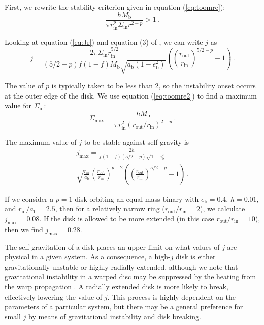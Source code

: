 \documentclass[twocolumn,linenumbers]{aastex631}
\begin{document}
First, we rewrite the stability criterion given in equation (\ref{eq:toomre}):
\begin{equation}
    \label{eq:toomre2}
    \frac{h M_\text{b}}{\pi r_\text{in}^p \Sigma_\text{in} r^{2-p}} > 1\, .
\end{equation}

Looking at equation (\ref{eq:Jr}) and equation (3) of \citet{abod2022}, we can write $j$ as
\begin{equation}
    \label{eq:j-full-disk}
    j = \frac{2\pi \Sigma_\text{in} r_\text{in}^{5/2}}{(5/2-p)f(1-f)M_\text{b}\sqrt{a_\text{b}(1-e_\text{b}^2)}}  \left( \left( \frac{r_\text{out}}{r_\text{in}} \right)^{5/2 - p}- 1\right) \, .
\end{equation}

The value of $p$ is typically taken to be less than 2, so the instability onset occurs at the outer edge of the disk. We use equation (\ref{eq:toomre2}) to find a maximum value for $\Sigma_\text{in}$:
\begin{equation}
    \Sigma_\text{max} = \frac{hM_\text{b}}{\pi r_\text{in}^2 (r_\text{out}/r_\text{in})^{2-p}}\, .
\end{equation}

The maximum value of $j$ to be stable against self-gravity is
\begin{multline}
    \label{eq:jmax-shallow}
    j_\text{max} = \frac{2h}{f (1-f) (5/2 - p)\sqrt{1-e_\text{b}^2}}\\ \sqrt{\frac{r_\text{in}}{a_\text{b}}} \left(\frac{r_\text{out}}{r_\text{in}}\right)^{p-2} \left( \left( \frac{r_\text{out}}{r_\text{in}} \right)^{5/2 - p}- 1\right)\, .
\end{multline}

If we consider a $p=1$ disk orbiting an equal mass binary with $e_\text{b}=0.4$, $h=0.01$, and $r_\text{in}/a_\text{b}=2.5$, then for a relatively narrow ring ($r_\text{out}/r_\text{in} = 2$), we calculate $j_\text{max} = 0.08$. If the disk is allowed to be more extended (in this case $r_\text{out}/r_\text{in} = 10$), then we find $j_\text{max} = 0.28$.

The self-gravitation of a disk places an upper limit on what values of $j$ are physical in a given system. As a consequence, a high-$j$ disk is either gravitationally unstable or highly radially extended, although we note that gravitational instability in a warped disc may be suppressed by the heating from the warp propagation \citep{rowther2022}.  A radially extended disk is more likely to break, effectively lowering the value of $j$. This process is highly dependent on the parameters of a particular system, but there may be a general preference for small $j$ by means of gravitational instability and disk breaking.
\end{document}
